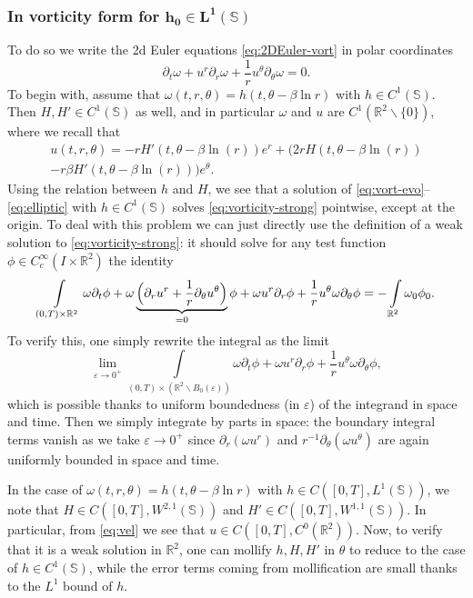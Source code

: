 \documentclass[10pt]{amsart}
\let\oldthesubsubsection\thesubsubsection
\renewcommand{\thesubsubsection}{\arabic{subsubsection}}
\let\epsilon\varepsilon
\theoremstyle{plain}
\theoremstyle{definition}
\let\rd\partial
\let\eps\epsilon
\let\tht\theta
\let\omg\omega
\newcommand{\bbR}{\mathbb R}
\newcommand{\bbS}{\mathbb S}
\begin{document}
\let\thesubsubsection\oldthesubsubsection
\subsubsection{In vorticity form for $\boldsymbol{h_0\in L^1\left(\mathbb{S}\right)}$}
To do so we write the 2d Euler equations \eqref{eq:2DEuler-vort} in polar coordinates
\begin{equation}\label{eq:vorticity-strong}
\partial_t \omega+u^r\partial_r \omega+\frac{1}{r}u^\theta \partial_\theta \omega=0.
\end{equation}
To begin with, assume that $\omg(t,r,\theta)=h(t,\theta-\beta\ln r)$ with $h \in C^{1}(\bbS)$. Then $H, H' \in C^{1}(\bbS)$ as well, and in particular $\omg$ and $u$ are $C^{1}(\bbR^{2}\backslash\{0\})$, where we recall that
\begin{multline}\label{eq:vel}
u(t,r,\theta)= -r H'(t,\theta -\beta \ln (r)) e^{r} + (
2r H(t,\theta -\beta \ln (r))\\
-r\beta H'(t,\theta -\beta \ln (r))) e^{\tht}.
\end{multline}
Using the relation between $h$ and $H$, we see that a solution of \eqref{eq:vort-evo}--\eqref{eq:elliptic} with $h \in C^{1}(\bbS)$ solves \eqref{eq:vorticity-strong} pointwise, except at the origin. To deal with this problem we can just directly use the definition of a weak solution to \eqref{eq:vorticity-strong}: it should solve for any test function $\phi\in C^{\infty}_c\left(I\times \mathbb{R}^2\right)$ the identity
\[
\int\limits_{(0,T)\times\mathbb{R}^2}\omega \partial_t\phi+\omega\underbrace{\Bigl(\partial_r u^r+\frac{1}{r}\partial_\theta u^\theta\Bigr)}_{=0}\phi+\omega u^r\partial_r \phi+\frac{1}{r}u^\theta\omega \partial_\theta \phi=-\int\limits_{\mathbb{R}^2}\omega_0\phi_0.
\]
To verify this, one simply rewrite the integral as the limit
\[
\lim_{\eps\to 0^+} \int\limits_{(0,T)\times(\mathbb{R}^2 \backslash B_{0}(\eps)) }\omega \partial_t\phi+\omega u^r\partial_r \phi+\frac{1}{r}u^\theta\omega \partial_\theta \phi,
\]
which is possible thanks to uniform boundedness (in $\eps$) of the integrand in space and time. Then we simply integrate by parts in space: the boundary integral terms vanish as we take $\eps\to 0^+$ since $\rd_r(\omg u^r)$ and $r^{-1}\rd_\tht(\omg u^\tht)$ are again uniformly bounded in space and time.

In the case of $\omg(t,r,\theta)=h(t,\theta-\beta\ln r)$ with $h \in C\left([0,T], L^{1}(\bbS)\right)$, we note that $H \in C\left([0,T], W^{2,1}(\bbS)\right)$ and $H' \in C\left([0,T], W^{1,1}(\bbS)\right)$. In particular, from \eqref{eq:vel} we see that $u\in C\left([0,T], C^0(\mathbb{R}^2)\right)$. Now, to verify that it is a weak solution in $\bbR^{2}$, one can mollify $h, H, H'$ in $\theta$ to reduce to the case of $h \in C^1(\bbS)$, while the error terms coming from mollification are small thanks to the $L^1$ bound of $h$.
\end{document}
